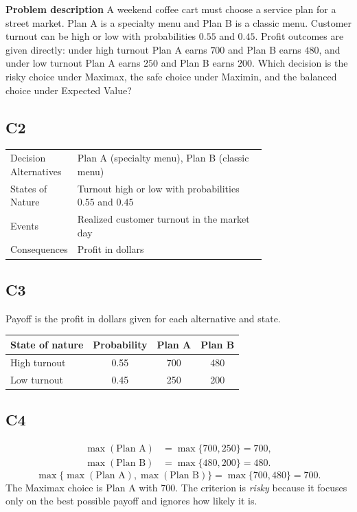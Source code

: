 	\begin{ExamProblems}
		\item
		\textbf{Problem description}
		A weekend coffee cart must choose a service plan for a street market. Plan A is a specialty menu and Plan B is a classic menu. Customer turnout can be high or low with probabilities $0.55$ and $0.45$. Profit outcomes are given directly: under high turnout Plan A earns $700$ and Plan B earns $480$, and under low turnout Plan A earns $250$ and Plan B earns $200$. Which decision is the risky choice under Maximax, the safe choice under Maximin, and the balanced choice under Expected Value?

		\subsection*{C2}
		\begin{center}
			\begin{tabular}{l p{0.74\linewidth}}
				\toprule
				Decision Alternatives & Plan A (specialty menu), Plan B (classic menu) \\
				States of Nature & Turnout high or low with probabilities $0.55$ and $0.45$ \\
				Events & Realized customer turnout in the market day \\
				Consequences & Profit in dollars \\
				\bottomrule
			\end{tabular}
		\end{center}

		\subsection*{C3}
		Payoff is the profit in dollars given for each alternative and state.
		\begin{center}
			\begin{tabular}{l c c c}
				\toprule
				State of nature & Probability & Plan A & Plan B \\
				\midrule
				High turnout & 0.55 & 700 & 480 \\
				Low turnout & 0.45 & 250 & 200 \\
				\bottomrule
		\end{tabular}
		\end{center}

		\subsection*{C4}
		\[
		\begin{aligned}
		\max(\text{Plan A}) &= \max\{700,250\} = 700,\\
		\max(\text{Plan B}) &= \max\{480,200\} = 480.
		\end{aligned}
		\]
		\[
		\max\{\max(\text{Plan A}), \max(\text{Plan B})\}
		= \max\{700, 480\}
		= 700.
		\]
		The Maximax choice is Plan A with 700. The criterion is \emph{risky} because it focuses only on the best possible payoff and ignores how likely it is.


\end{ExamProblems}
